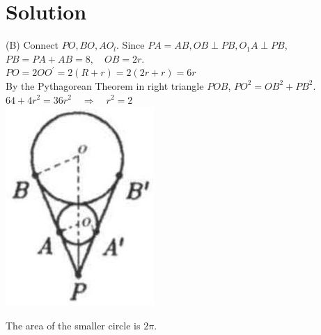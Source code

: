 \documentclass{article}
\begin{document}
\section*{Solution}
(B)
Connect \(P O, B O, A O_{l}\). Since \(P A=A B, O B \perp P B, O_{1} A \perp P B\), \(P B=P A+A B=8, \quad O B=2 r\).\\
\(P O=2 O O^{\prime}=2(R+r)=2(2 r+r)=6 r\)\\
By the Pythagorean Theorem in right triangle \(P O B\), \(P O^{2}=O B^{2}+P B^{2}\).\\
\(64+4 r^{2}=36 r^{2} \quad \Rightarrow \quad r^{2}=2\)\\
\centering
\includegraphics[width=\textwidth]{images/187(1).jpg}

The area of the smaller circle is \(2 \pi\).
\end{document}
